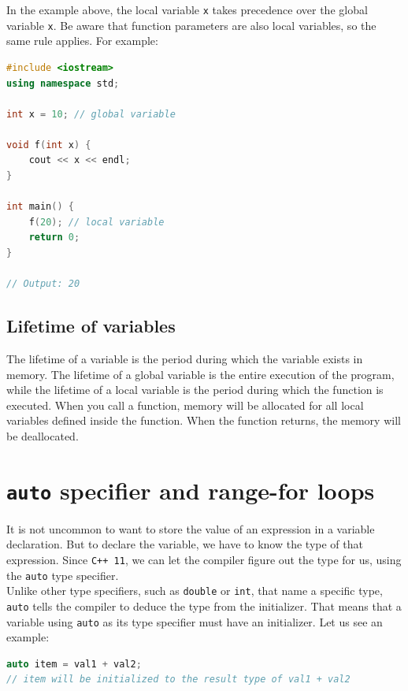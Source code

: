 In the example above, the local variable \texttt{x} takes precedence over the global variable \texttt{x}. Be aware
that function parameters are also local variables, so the same rule applies. For example:\\

\begin{lstlisting}[language=C++]
#include <iostream>
using namespace std;

int x = 10; // global variable

void f(int x) {
    cout << x << endl;
}

int main() {
    f(20); // local variable
    return 0;
}

// Output: 20
\end{lstlisting}

\subsection{Lifetime of variables}

The lifetime of a variable is the period during which the variable exists in memory. The lifetime of a global variable
is the entire execution of the program, while the lifetime of a local variable is the period during which the function is
executed. When you call a function, memory will be allocated for all local variables defined inside the function. When the
function returns, the memory will be deallocated.

\section{\texttt{auto} specifier and range-for loops}

It is not uncommon to want to store the value of an expression in a variable declaration.
But to declare the variable, we have to know the type of that expression. 
Since \texttt{C++ 11}, we can let the compiler figure out the type for us, using
the \texttt{auto} type specifier.\\

Unlike other type specifiers, such as \texttt{double} or \texttt{int}, that name a
specific type, \texttt{auto} tells the compiler to deduce the type from the initializer.
That means that a variable using \texttt{auto} as its type specifier must have an 
initializer. Let us see an example:\\

\begin{lstlisting}[language=C++]
auto item = val1 + val2;
// item will be initialized to the result type of val1 + val2
\end{lstlisting}

